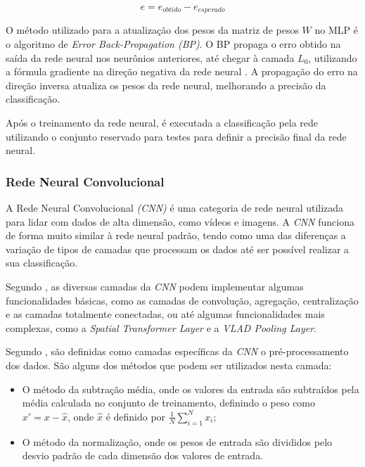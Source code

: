 \documentclass[
	12pt,				%
	openright,			%
	oneside,
	a4paper,			%
	english,			%
	french,				%
	spanish,			%
	brazil				%
	]{abntex2}
\begin{document}
    \[ e = e_{obtido} - e_{esperado}  \]

    O método utilizado para a atualização dos pesos da matriz de pesos $W$ no MLP é o algoritmo de \textit{Error Back-Propagation (BP)}. O BP propaga o erro obtido na saída da rede neural nos neurônios anteriores, até chegar à camada $L_0$, utilizando a fórmula gradiente na direção negativa da rede neural \cite{ruano2003}. A propagação do erro na direção inversa atualiza os pesos da rede neural, melhorando a precisão da classificação.

    Após o treinamento da rede neural, é executada a classificação pela rede utilizando o conjunto reservado para testes para definir a precisão final da rede neural.

\subsubsection{Rede Neural Convolucional}
    A Rede Neural Convolucional \textit{(CNN)} é uma categoria de rede neural utilizada para lidar com dados de alta dimensão, como vídeos e imagens. A \textit{CNN} funciona de forma muito similar à rede neural padrão, tendo como uma das diferenças a variação de tipos de camadas que processam os dados até ser possível realizar a sua classificação. \cite{salmankhanhosseinrahmanisyedafaqalishah2018}
    
    Segundo , as diversas camadas da \textit{CNN} podem implementar algumas funcionalidades básicas, como as camadas de convolução, agregação, centralização e as camadas totalmente conectadas, ou até algumas funcionalidades mais complexas, como a \textit{Spatial Transformer Layer} e a \textit{VLAD Pooling Layer}.
    
    Segundo , são definidas como camadas específicas da \textit{CNN} o pré-processamento dos dados. São alguns dos métodos que podem ser utilizados nesta camada:
    \begin{itemize}
        \item 
        O método da subtração média, onde os valores da entrada são subtraídos pela média calculada no conjunto de treinamento, definindo o peso como $x' = x - \hat{x}$, onde $\hat{x}$ é definido por $\frac{1}{N} \sum_{i=1}^{N} x_i$;
        
        \item
        O método da normalização, onde os pesos de entrada são divididos pelo desvio padrão de cada dimensão dos valores de entrada.
    \end{itemize} 
    
\end{document}
